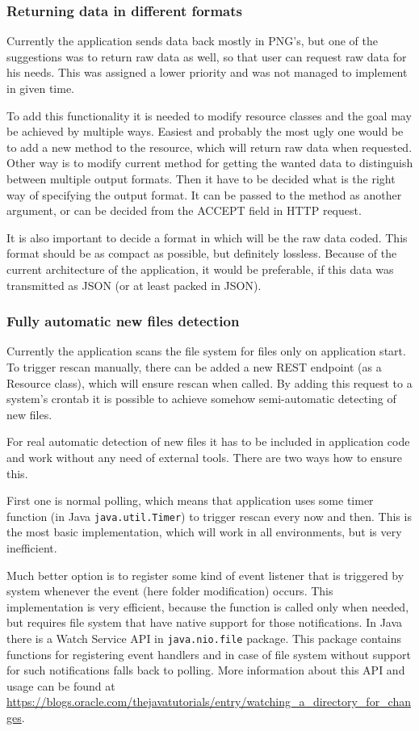 \documentclass[11pt,a4paper,titlepage,oneside]{report}
\begin{document}
\subsubsection{Returning data in different formats}
Currently the application sends data back mostly in \gls{PNG}'s, but one of the suggestions was to return raw data as well, so that user can request raw data for his needs. This was assigned a lower priority and was not managed to implement in given time.

To add this functionality it is needed to modify resource classes and the goal may be achieved by multiple ways. Easiest and probably the most ugly one would be to add a new method to the resource, which will return raw data when requested. Other way is to modify current method for getting the wanted data to distinguish between multiple output formats. Then it have to be decided what is the right way of specifying the output format. It can be passed to the method as another argument, or can be decided from the ACCEPT field in HTTP request.

It is also important to decide a format in which will be the raw data coded. This format should be as compact as possible, but definitely lossless. Because of the current architecture of the application, it would be preferable, if this data was transmitted as JSON (or at least packed in JSON).

\subsubsection{Fully automatic new files detection}
Currently the application scans the file system for files only on application start. To trigger rescan manually, there can be added a new REST endpoint (as a Resource class), which will ensure rescan when called. By adding this request to a system's crontab it is possible to achieve somehow semi-automatic detecting of new files.

For real automatic detection of new files it has to be included in application code and work without any need of external tools. There are two ways how to ensure this.

First one is normal polling, which means that application uses some timer function (in Java \texttt{java.util.Timer}) to trigger rescan every now and then. This is the most basic implementation, which will work in all environments, but is very inefficient.

Much better option is to register some kind of event listener that is triggered by system whenever the event (here folder modification) occurs. This implementation is very efficient, because the function is called only when needed, but requires file system that have native support for those notifications. In Java there is a Watch Service API in \texttt{java.nio.file} package. This package contains functions for registering event handlers and in case of file system without support for such notifications falls back to polling. More information about this API and usage can be found at \url{https://blogs.oracle.com/thejavatutorials/entry/watching_a_directory_for_changes}.
\end{document}
